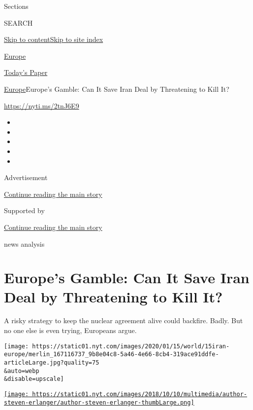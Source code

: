 Sections

SEARCH

\protect\hyperlink{site-content}{Skip to
content}\protect\hyperlink{site-index}{Skip to site index}

\href{https://www.nytimes.com/section/world/europe}{Europe}

\href{https://myaccount.nytimes.com/auth/login?response_type=cookie\&client_id=vi}{}

\href{https://www.nytimes.com/section/todayspaper}{Today's Paper}

\href{/section/world/europe}{Europe}\textbar{}Europe's Gamble: Can It
Save Iran Deal by Threatening to Kill It?

\url{https://nyti.ms/2tnJ6E9}

\begin{itemize}
\item
\item
\item
\item
\item
\end{itemize}

Advertisement

\protect\hyperlink{after-top}{Continue reading the main story}

Supported by

\protect\hyperlink{after-sponsor}{Continue reading the main story}

news analysis

\hypertarget{europes-gamble-can-it-save-iran-deal-by-threatening-to-kill-it}{%
\section{Europe's Gamble: Can It Save Iran Deal by Threatening to Kill
It?}\label{europes-gamble-can-it-save-iran-deal-by-threatening-to-kill-it}}

A risky strategy to keep the nuclear agreement alive could backfire.
Badly. But no one else is even trying, Europeans argue.

\texttt{[image: https://static01.nyt.com/images/2020/01/15/world/15iran-europe/merlin\_167116737\_9b8e04c8-5a46-4e66-8cb4-319ace91ddfe-articleLarge.jpg?quality=75\\\&auto=webp\\\&disable=upscale]}

\href{https://www.nytimes.com/by/steven-erlanger}{\texttt{[image: https://static01.nyt.com/images/2018/10/10/multimedia/author-steven-erlanger/author-steven-erlanger-thumbLarge.png]}}

